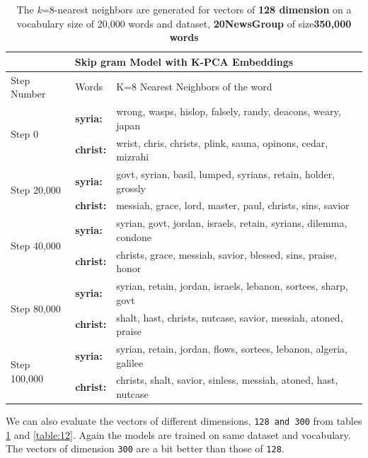  \begin{table}
 	\centering
\begin{tabular}{|l|l|l|}
	\hline
	\multicolumn{3}{|c|}{Skip gram Model with K-PCA Embeddings} \\
	\hline
	Step Number & Words & K=8 Nearest Neighbors of the word \\ \hline
	\multirow{2}{*}{Step 0} & \textbf{syria:} & wrong, wasps, hislop, falsely, randy, deacons, weary, japan \\
	& \textbf{christ:} & wrist, chris, christs, plink, sauna, opinons, cedar, mizrahi \\
	\hline
	\multirow{2}{*}{Step 20,000} & \textbf{syria:} & govt, syrian, basil, lumped, syrians, retain, holder, grossly \\
	& \textbf{christ:} & messiah, grace, lord, master, paul, christs, sins, savior \\
	 \hline
	\multirow{2}{*}{Step 40,000} & \textbf{syria:} & syrian, govt, jordan, israels, retain, syrians, dilemma, condone \\
	& \textbf{christ:} & christs, grace, messiah, savior, blessed, sins, praise, honor \\
	\hline
	\multirow{2}{*}{Step 80,000} & \textbf{syria:} & syrian, retain, jordan, israels, lebanon, sortees, sharp, govt \\
	& \textbf{christ:} & shalt, hast, christs, nutcase, savior, messiah, atoned, praise \\
	\hline
	\multirow{2}{*}{Step 100,000} & \textbf{syria:} &  syrian, retain, jordan, flows, sortees, lebanon, algeria, galilee\\
	& \textbf{christ:} & christs, shalt, savior, sinless, messiah, atoned, hast, nutcase\\
	\hline
\end{tabular}
\caption{The \textit{k}=8-nearest neighbors are generated for vectors of \textbf{128 dimension} on a vocabulary size of 20,000 words and dataset, \textbf{20NewsGroup} of size\textbf{350,000 words}}\label{table:11}
 \end{table}
We can also evaluate the vectors of different dimensions, \texttt{128 and 300} from tables \ref{table:11} and \ref{table:12}. Again the models are trained on same dataset and vocabulary. The vectors of dimension \texttt{300} are a bit better than those of \texttt{128}.
